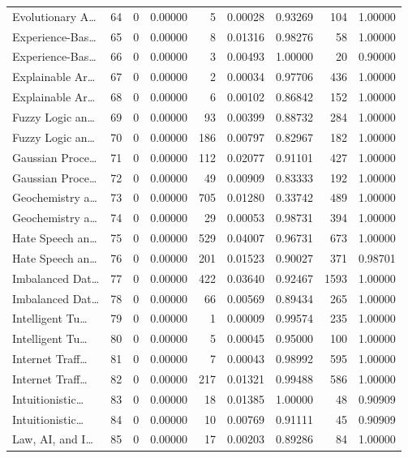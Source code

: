 \begin{table}
\begin{tabular}{lrrrrrrrr}
Evolutionary A… & 64 & 0 & 0.00000 & 5 & 0.00028 & 0.93269 & 104 & 1.00000 \\
Experience-Bas… & 65 & 0 & 0.00000 & 8 & 0.01316 & 0.98276 & 58 & 1.00000 \\
Experience-Bas… & 66 & 0 & 0.00000 & 3 & 0.00493 & 1.00000 & 20 & 0.90000 \\
Explainable Ar… & 67 & 0 & 0.00000 & 2 & 0.00034 & 0.97706 & 436 & 1.00000 \\
Explainable Ar… & 68 & 0 & 0.00000 & 6 & 0.00102 & 0.86842 & 152 & 1.00000 \\
Fuzzy Logic an… & 69 & 0 & 0.00000 & 93 & 0.00399 & 0.88732 & 284 & 1.00000 \\
Fuzzy Logic an… & 70 & 0 & 0.00000 & 186 & 0.00797 & 0.82967 & 182 & 1.00000 \\
Gaussian Proce… & 71 & 0 & 0.00000 & 112 & 0.02077 & 0.91101 & 427 & 1.00000 \\
Gaussian Proce… & 72 & 0 & 0.00000 & 49 & 0.00909 & 0.83333 & 192 & 1.00000 \\
Geochemistry a… & 73 & 0 & 0.00000 & 705 & 0.01280 & 0.33742 & 489 & 1.00000 \\
Geochemistry a… & 74 & 0 & 0.00000 & 29 & 0.00053 & 0.98731 & 394 & 1.00000 \\
Hate Speech an… & 75 & 0 & 0.00000 & 529 & 0.04007 & 0.96731 & 673 & 1.00000 \\
Hate Speech an… & 76 & 0 & 0.00000 & 201 & 0.01523 & 0.90027 & 371 & 0.98701 \\
Imbalanced Dat… & 77 & 0 & 0.00000 & 422 & 0.03640 & 0.92467 & 1593 & 1.00000 \\
Imbalanced Dat… & 78 & 0 & 0.00000 & 66 & 0.00569 & 0.89434 & 265 & 1.00000 \\
Intelligent Tu… & 79 & 0 & 0.00000 & 1 & 0.00009 & 0.99574 & 235 & 1.00000 \\
Intelligent Tu… & 80 & 0 & 0.00000 & 5 & 0.00045 & 0.95000 & 100 & 1.00000 \\
Internet Traff… & 81 & 0 & 0.00000 & 7 & 0.00043 & 0.98992 & 595 & 1.00000 \\
Internet Traff… & 82 & 0 & 0.00000 & 217 & 0.01321 & 0.99488 & 586 & 1.00000 \\
Intuitionistic… & 83 & 0 & 0.00000 & 18 & 0.01385 & 1.00000 & 48 & 0.90909 \\
Intuitionistic… & 84 & 0 & 0.00000 & 10 & 0.00769 & 0.91111 & 45 & 0.90909 \\
Law, AI, and I… & 85 & 0 & 0.00000 & 17 & 0.00203 & 0.89286 & 84 & 1.00000 \\

\end{tabular}
\end{table}
